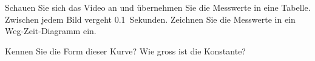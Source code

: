 \begin{aufgabe}
	Schauen Sie sich das Video an und übernehmen Sie die Messwerte in eine Tabelle.
	Zwischen jedem Bild vergeht \SI{0.1}{Sekunden}.
	Zeichnen Sie die Messwerte in ein Weg-Zeit-Diagramm ein.

	Kennen Sie die Form dieser Kurve? Wie gross ist die Konstante?
\end{aufgabe}

